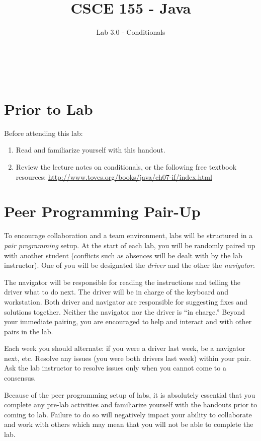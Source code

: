 \documentclass[12pt]{scrartcl}
\title{CSCE 155 - Java}
\subtitle{Lab 3.0 - Conditionals}
\author{~}
\date{~}
\begin{document}
\maketitle

\section*{Prior to Lab}

Before attending this lab:

\begin{enumerate}
  \item Read and familiarize yourself with this handout.
  \item Review the lecture notes on conditionals, or the following free textbook resources: \url{http://www.toves.org/books/java/ch07-if/index.html}
\end{enumerate}

\section*{Peer Programming Pair-Up}

To encourage collaboration and a team environment, labs will be
structured in a \emph{pair programming} setup.  At the start of
each lab, you will be randomly paired up with another student 
(conflicts such as absences will be dealt with by the lab instructor).
One of you will be designated the \emph{driver} and the other
the \emph{navigator}.  

The navigator will be responsible for reading the instructions and
telling the driver what to do next.  The driver will be in charge of the
keyboard and workstation.  Both driver and navigator are responsible
for suggesting fixes and solutions together.  Neither the navigator
nor the driver is ``in charge.''  Beyond your immediate pairing, you
are encouraged to help and interact and with other pairs in the lab.

Each week you should alternate: if you were a driver last week, 
be a navigator next, etc.  Resolve any issues (you were both drivers
last week) within your pair.  Ask the lab instructor to resolve issues
only when you cannot come to a consensus.  

Because of the peer programming setup of labs, it is absolutely 
essential that you complete any pre-lab activities and familiarize
yourself with the handouts prior to coming to lab.  Failure to do
so will negatively impact your ability to collaborate and work with 
others which may mean that you will not be able to complete the
lab.  
\end{document}
